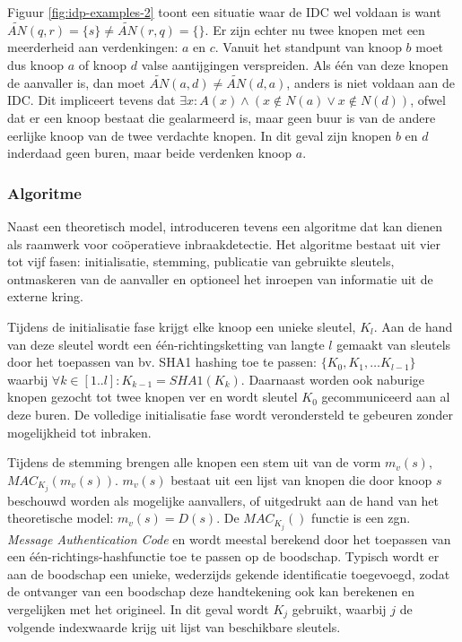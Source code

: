 Figuur \ref{fig:idp-examples-2} toont een situatie waar de IDC wel voldaan is
want $\tilde{AN}(q,r) = \{s\} \not= \tilde{AN}(r,q) = \{\}$. Er zijn echter nu
twee knopen met een meerderheid aan verdenkingen: $a$ en $c$. Vanuit het
standpunt van knoop $b$ moet dus knoop $a$ of knoop $d$ valse aantijgingen
verspreiden. Als \'e\'en van deze knopen de aanvaller is, dan moet
$\tilde{AN}(a,d) \not= \tilde{AN}(d,a)$, anders is niet voldaan aan de IDC. Dit
impliceert tevens dat $\exists x : A(x) \wedge ( x \not\in N(a) \vee x \not\in
N(d) )$, ofwel dat er een knoop bestaat die gealarmeerd is, maar geen buur is
van de andere eerlijke knoop van de twee verdachte knopen. In dit geval zijn
knopen $b$ en $d$ inderdaad geen buren, maar beide verdenken knoop $a$.

\subsubsection*{Algoritme}

Naast een theoretisch model, introduceren \cite{krontiris2009cooperative}
tevens een algoritme dat kan dienen als raamwerk voor co\"operatieve
inbraakdetectie. Het algoritme bestaat uit vier tot vijf fasen: initialisatie,
stemming, publicatie van gebruikte sleutels, ontmaskeren van de aanvaller en
optioneel het inroepen van informatie uit de externe kring.

Tijdens de initialisatie fase krijgt elke knoop een unieke sleutel, $K_l$. Aan
de hand van deze sleutel wordt een \'e\'en-richtingsketting van langte $l$
gemaakt van sleutels door het toepassen van bv. SHA1 \cite{rfc:3174} hashing
toe te passen: $\{K_0, K_1, \dots K_{l-1}\}$ waarbij $\forall k \in [1..l] :
K_{k-1} = SHA1(K_k)$. Daarnaast worden ook naburige knopen gezocht tot twee
knopen ver en wordt sleutel $K_0$ gecommuniceerd aan al deze buren. De
volledige initialisatie fase wordt verondersteld te gebeuren zonder
mogelijkheid tot inbraken.

Tijdens de stemming brengen alle knopen een stem uit van de vorm $m_v(s),$ $
MAC_{K_j}(m_v(s))$. $m_v(s)$ bestaat uit een lijst van knopen die door knoop
$s$ beschouwd worden als mogelijke aanvallers, of uitgedrukt aan de hand van
het theoretische model: $m_v(s) = D(s)$. De $MAC_{K_j}()$ functie is een zgn.
\emph{Message Authentication Code} \cite{rfc:2104} en wordt meestal berekend
door het toepassen van een \'e\'en-richtings-hashfunctie toe te passen op de
boodschap. Typisch wordt er aan de boodschap een unieke, wederzijds gekende
identificatie toegevoegd, zodat de ontvanger van een boodschap deze
handtekening ook kan berekenen en vergelijken met het origineel. In dit geval
wordt $K_j$ gebruikt, waarbij $j$ de volgende indexwaarde krijg uit lijst van
beschikbare sleutels.

